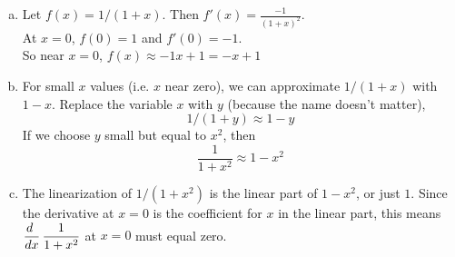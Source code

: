 \begin{enumerate}[1.]
\begin{multicols}{2}
\begin{Solution}
  \begin{enumerate}[(a)]
  \item Let $f(x) = 1/(1+x)$.  Then $f'(x) = \frac{-1}{(1+x)^2}$. \\
    At $x=0$, $f(0) = 1$ and $f'(0) = -1$. \\
    So near $x=0$, $f(x) \approx -1 x + 1 = -x + 1$ \\
  \item For small $x$ values (i.e. $x$ near zero), we can approximate
    $1/(1+x)$ with $1-x$.  Replace the variable $x$ with $y$ (because
    the name doesn't matter),
$$1/(1+y)  \approx 1-y$$
If we choose $y$ small but equal to $x^2$, then 
$$\frac{1}{1 + x^2} \approx 1-x^2$$
\item The linearization of $1/(1+x^2)$ is the linear part of $1 -
  x^2$, or just $1$.  Since the derivative at $x=0$ is the coefficient
  for $x$ in the linear part, this means $\displaystyle \frac{d {~}}{dx} \,\frac{1}{1+x^2}$ at $x=0$
  must equal zero.
\end{enumerate}
  \end{Solution}

 


\end{multicols}
\end{enumerate}

